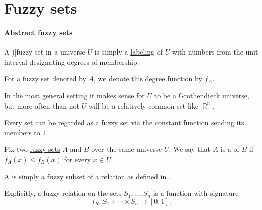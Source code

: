 \section{Fuzzy sets}\label{sec:fuzzy_sets}

\paragraph{Abstract fuzzy sets}

\begin{definition}\label{def:fuzzy_set}
  A \term[ru=нечёткое множество (\cite[27]{БогомоловСалий1997ДискретныеСистемы})]{fuzzy set} in a universe \( U \) is simply a \hyperref[def:labeled_set]{labeling} of \( U \) with numbers from the unit interval designating degrees of membership.

  For a fuzzy set denoted by \( A \), we denote this degree function by \( f_A \).
\end{definition}
\begin{comments}
  \item In the most general setting it makes sense for \( U \) to be a \hyperref[def:grothendieck_universe]{Grothendieck universe}, but more often than not \( U \) will be a relatively common set like \( \BbbR^n \).

  \item Every set can be regarded as a fuzzy set via the constant function sending its members to \( 1 \).
\end{comments}

\begin{definition}\label{def:fuzzy_subset}
  Fix two \hyperref[def:fuzzy_set]{fuzzy sets} \( A \) and \( B \) over the same universe \( U \). We say that \( A \) is a  of \( B \) if \( f_A(x) \leq f_B(x) \) for every \( x \in U \).
\end{definition}

\begin{definition}\label{def:fuzzy_relation}
  A  is simply a \hyperref[def:fuzzy_set]{fuzzy subset} of a relation as defined in .

  Explicitly, a fuzzy relation on the sets \( S_1, \ldots, S_n \) is a function with signature
  \begin{equation*}
    f_R: S_1 \times \cdots \times S_n \to [0, 1].
  \end{equation*}
\end{definition}

